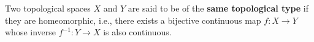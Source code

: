 Two topological spaces $X$ and $Y$ are said to be of the \textbf{same topological type} if they are homeomorphic, i.e., there exists a bijective continuous map $f: X \to Y$ whose inverse $f^{-1}: Y \to X$ is also continuous.
